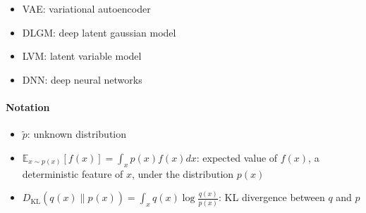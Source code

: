 \documentclass{article}
\newcommand{\prob}[3]{{#1}_{#2} \left( #3 \right)}
\newcommand{\expected}[2]{\mathbb{E}_{#1}\left[ #2 \right]}
\newcommand{\KL}[2]{D_{\mathrm{KL}}\left( #1 \| #2 \right)}
\begin{document}
\begin{itemize}
\item VAE: variational autoencoder
\item DLGM: deep latent gaussian model
\item LVM: latent variable model
\item DNN: deep neural networks
\end{itemize}

\paragraph{Notation}
\begin{itemize}
\item $\tilde{p}$: unknown distribution
\item $\expected{x\sim p(x)}{f(x)}=\int_x p(x)f(x)dx$: expected value of $f(x)$, a deterministic feature of $x$, under the distribution $p(x)$
\item $\KL{\prob{q}{}{x}}{\prob{p}{}{x}} = \int_x q(x)\log\frac{q(x)}{p(x)}$: KL divergence between $q$ and $p$
\end{itemize}

 

\end{document}
